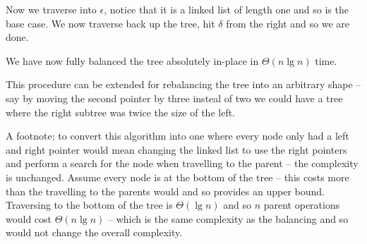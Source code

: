 \documentclass[10pt,\jkfside,a4paper]{article}
\begin{document}
\begin{enumerate}
\begin{enumerate}
\begin{center}
\end{center}

Now we traverse into $\epsilon$, notice that it is a linked list of length one and so is the base case. We now 
traverse back up the tree, hit $\delta$ from the right and so we are done.

We have now fully balanced the tree absolutely in-place in $\Theta(n \lg n)$ time.

This procedure can be extended for rebalancing the tree into an arbitrary shape -- say by moving the 
second pointer by three insteal of two we could have a tree where the right subtree was twice the size of the left.

A footnote; to convert this algorithm into one where every node only had a left and right pointer would 
mean changing the linked list to use the right pointers and perform a search for the node when travelling 
to the parent -- the complexity is unchanged. Assume every node is at the bottom of the tree -- this costs more than 
the travelling to the parents would and so provides an upper bound. Traversing to the bottom of the tree is 
$\Theta(\lg n)$ and so $n$ parent operations would cost $\Theta(n \lg n)$ -- which is the same complexity as the 
balancing and so would not change the overall complexity.

\end{enumerate}

\end{enumerate}
\end{document}
